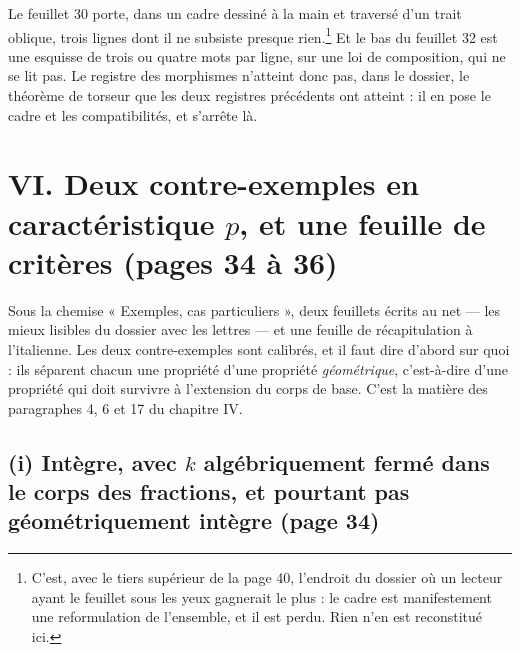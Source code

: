 \documentclass[11pt,a4paper]{article}
\begin{document}
Le feuillet 30 porte, dans un cadre dessiné à la main et traversé d'un trait
oblique, trois lignes dont il ne subsiste presque rien.\footnote{C'est,
avec le tiers supérieur de la page 40, l'endroit du dossier où un lecteur ayant
le feuillet sous les yeux gagnerait le plus : le cadre est manifestement une
reformulation de l'ensemble, et il est perdu. Rien n'en est reconstitué ici.} Et
le bas du feuillet 32 est une esquisse de trois ou quatre mots par ligne, sur
une loi de composition, qui ne se lit pas. Le registre des morphismes n'atteint
donc pas, dans le dossier, le théorème de torseur que les deux registres
précédents ont atteint : il en pose le cadre et les compatibilités, et s'arrête
là.

\section*{VI. Deux contre-exemples en caractéristique $p$, et une feuille de critères (pages 34 à 36)}

Sous la chemise « Exemples, cas particuliers », deux feuillets écrits au net —
les mieux lisibles du dossier avec les lettres — et une feuille de
récapitulation à l'italienne. Les deux contre-exemples sont calibrés, et il faut
dire d'abord sur quoi : ils séparent chacun une propriété d'une propriété
\emph{géométrique}, c'est-à-dire d'une propriété qui doit survivre à
l'extension du corps de base. C'est la matière des paragraphes 4, 6 et 17 du
chapitre IV.

\subsection*{(i) Intègre, avec $k$ algébriquement fermé dans le corps des fractions, et pourtant pas géométriquement intègre (page 34)}
\end{document}
